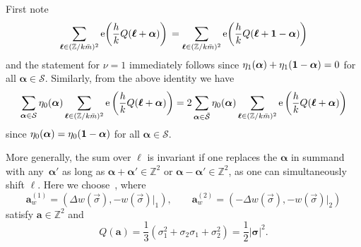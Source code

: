 \documentclass[pdftex]{sigma}
\def\CS{\mathcal{S}}
\def\ss{ \tilde{\mathcal{S}} }
\newcommand{\ZZ}{\mathbb{Z}}
\def\bal{\boldsymbol{\alpha}}
\def\bol{\boldsymbol{\ell}}
\def\ex{{\rm e}}
\theoremstyle{definition}
\numberwithin{equation}{section}
\begin{document}
First note
\[
\sum_{\boldsymbol{\ell}\in (\ZZ/k\bar m)^2 } \ex\!\left(\frac{h}{k}Q(\bol+\bal)\right)\,
= \sum_{\boldsymbol{\ell}\in (\ZZ/k\bar m)^2 }\ex\!\left(\frac{h}{k}Q(\bol+{\bf 1}-\bal)\right)
\]
and the statement for $\nu=1$ immediately follows since $\eta_1(\bal)+\eta_1({\bf 1}-\bal)=0$ for all $\bal \in \CS$. Similarly, from the above identity we have
\begin{equation}\label{eqn:prooflem131}
\sum_{\bal\in\CS} \eta_0(\bal) \sum_{\boldsymbol{\ell}\in (\ZZ/k\bar m)^2 }\ex\left(\frac{h}{k}Q(\bol+\bal)\right)
= 2 \sum_{\bal\in\ss}\eta_0 (\bal) \sum_{\boldsymbol{\ell}\in (\ZZ/k\bar m)^2 }\ex\left(\frac{h}{k}Q(\bol+\bal)\right)\end{equation}
since $\eta_0(\bal)=\eta_0({\bf 1}-\bal)$ for all $\bal \in \CS$.


More generally, the sum over $\bol$ is invariant if one replaces the $\bal$ in summand with any~$\bal'$ as long as $\bal + \bal'\!\in \ZZ^2$ or $\bal -\bal'\in \ZZ^2$, as one can simultaneously shift $\bol$. Here we choose~\smash{$\bal_w^{(i)'}\! = \frac{1}{ m} \mathbf{a}_w^{(i)}$}, where
\begin{equation*}%
\mathbf{a}_w^{(1)}=
\left(\Delta w(\vec{\sigma}), -
{w(\vec{\sigma})\lvert_1}{}\right), \qquad
\mathbf{a}_w^{(2)}=
\left(-\Delta w(\vec{\sigma}),
-{w(\vec{\sigma})\lvert_2}\right)
\end{equation*}
satisfy $\mathbf{a} \in \ZZ^2$ and
\begin{equation}\label{eqn:norm_a}
Q\left( \mathbf{a} \right)=\frac{1}{3} \left(\sigma _1^2+\sigma _2 \sigma _1+\sigma _2^2\right)=\frac{1}{2} |\boldsymbol{\sigma}|^2.
\end{equation}
\end{document}
